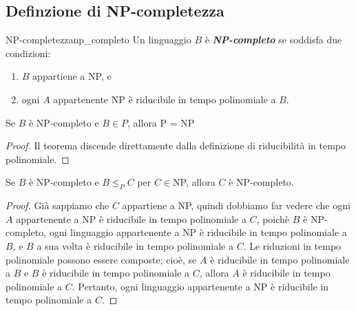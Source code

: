\documentclass[12pt]{report}
\newcounter{theorem}
\newcounter{definition}
\newcommand{\nmu}{}
\begin{document}
\subsection{Definzione di NP-completezza}
\begin{definition}{\nmu NP-completezza}{np_completo}
	Un linguaggio $B$ è \textbf{\textit{NP-completo}} se soddisfa due condizioni:
	\begin{enumerate}
		\item $B$ appartiene a NP, e
		\item ogni $A$ appartenente NP è riducibile in tempo polinomiale a $B$.
	\end{enumerate}
\end{definition}
\begin{theorem}{}{}
	Se $B$ è NP-completo e $B \in P$, allora P = NP
\end{theorem}
\begin{proof}
	Il teorema discende direttamente dalla definizione di riducibilità in tempo polinomiale.
\end{proof}
\begin{theorem}{}{}
	Se $B$ è NP-completo e $B \leq_P C$ per $C \in $NP, allora $C$ è NP-completo.
\end{theorem}
\begin{proof}
	Già sappiamo che $C$ appartiene a NP, quindi dobbiamo far vedere che ogni $A$ appartenente a NP è riducibile in tempo polinomiale a $C$, poichè $B$ è NP-completo, ogni linguaggio appartenente a NP è riducibile in tempo polinomiale a $B$, e $B$ a sua volta è riducibile in tempo polinomiale a $C$. Le riduzioni in tempo polinomiale possono essere composte; cioè, se $A$ è riducibile in tempo polinomiale a $B$ e $B$ è riducibile in tempo polinomiale a $C$, allora $A$ è riducibile in tempo polinomiale a $C$. Pertanto, ogni linguaggio appartenente a NP è riducibile in tempo polinomiale a $C$.
\end{proof}
\end{document}
